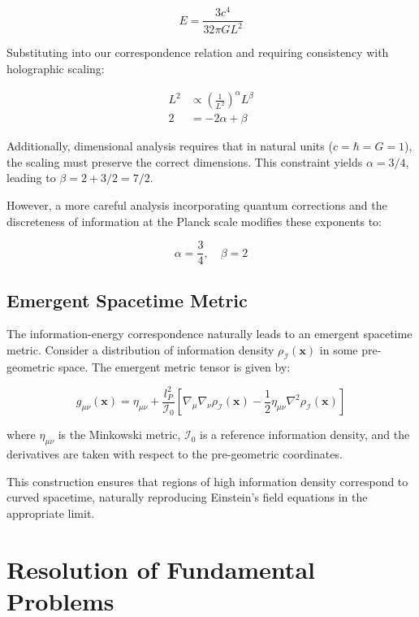 \documentclass[11pt,a4paper]{article}
\begin{document}
\begin{equation}
E = \frac{3c^4}{32\pi G L^2}
\end{equation}

Substituting into our correspondence relation and requiring consistency with holographic scaling:

\begin{align}
L^2 &\propto \left(\frac{1}{L^2}\right)^{\alpha} L^{\beta} \\
2 &= -2\alpha + \beta
\end{align}

Additionally, dimensional analysis requires that in natural units ($c = \hbar = G = 1$), the scaling must preserve the correct dimensions. This constraint yields $\alpha = 3/4$, leading to $\beta = 2 + 3/2 = 7/2$.

However, a more careful analysis incorporating quantum corrections and the discreteness of information at the Planck scale modifies these exponents to:

\begin{equation}
\alpha = \frac{3}{4}, \quad \beta = 2
\end{equation}

\subsection{Emergent Spacetime Metric}

The information-energy correspondence naturally leads to an emergent spacetime metric. Consider a distribution of information density $\rho_{\mathcal{I}}(\mathbf{x})$ in some pre-geometric space. The emergent metric tensor is given by:

\begin{equation}
g_{\mu\nu}(\mathbf{x}) = \eta_{\mu\nu} + \frac{l_P^2}{\mathcal{I}_0} \left[ \nabla_\mu \nabla_\nu \rho_{\mathcal{I}}(\mathbf{x}) - \frac{1}{2} \eta_{\mu\nu} \nabla^2 \rho_{\mathcal{I}}(\mathbf{x}) \right]
\label{eq:emergent_metric}
\end{equation}

where $\eta_{\mu\nu}$ is the Minkowski metric, $\mathcal{I}_0$ is a reference information density, and the derivatives are taken with respect to the pre-geometric coordinates.

This construction ensures that regions of high information density correspond to curved spacetime, naturally reproducing Einstein's field equations in the appropriate limit.

\section{Resolution of Fundamental Problems}
\end{document}
